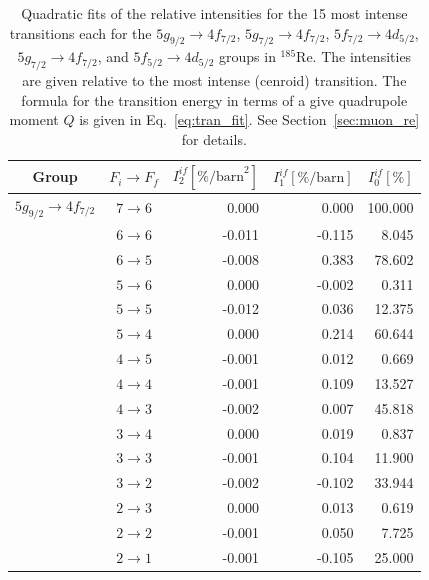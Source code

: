 %
%
%
\begin{table}[b]
\caption{\label{tab:re185intens}%
Quadratic fits of the relative intensities for the 15 most intense transitions each for the $5g_{9/2}\rightarrow4f_{7/2}$, $5g_{7/2}\rightarrow4f_{7/2}$, $5f_{7/2}\rightarrow4d_{5/2}$, $5g_{7/2}\rightarrow4f_{7/2}$, and $5f_{5/2}\rightarrow4d_{5/2}$ groups in $^{185}$Re. The intensities are given relative to the most intense (cenroid) transition. The formula for the transition energy in terms of a give quadrupole moment $Q$ is given in Eq.~\eqref{eq:tran_fit}. See Section~\ref{sec:muon_re} for details.}
\centering
\begin{tiny}
\begin{tabular}{cc|rrr}
Group& $F_i \rightarrow F_f$ & $I_2^{if} [\%\text{/barn}^2]$ & $I_1^{if} [\%\text{/barn}]$ & $I_0^{if} [\%]$\\[1pt]\hline%
$5g_{9/2} \rightarrow 4f_{7/2}$  &  $7 \rightarrow 6$  &  0.000  &  0.000  &  100.000\\
&  $6 \rightarrow 6$  &  -0.011  &  -0.115  &  8.045\\
&  $6 \rightarrow 5$  &  -0.008  &  0.383  &  78.602\\
&  $5 \rightarrow 6$  &  0.000  &  -0.002  &  0.311\\
&  $5 \rightarrow 5$  &  -0.012  &  0.036  &  12.375\\
&  $5 \rightarrow 4$  &  0.000  &  0.214  &  60.644\\
&  $4 \rightarrow 5$  &  -0.001  &  0.012  &  0.669\\
&  $4 \rightarrow 4$  &  -0.001  &  0.109  &  13.527\\
&  $4 \rightarrow 3$  &  -0.002  &  0.007  &  45.818\\
&  $3 \rightarrow 4$  &  0.000  &  0.019  &  0.837\\
&  $3 \rightarrow 3$  &  -0.001  &  0.104  &  11.900\\
&  $3 \rightarrow 2$  &  -0.002  &  -0.102  &  33.944\\
&  $2 \rightarrow 3$  &  0.000  &  0.013  &  0.619\\
&  $2 \rightarrow 2$  &  -0.001  &  0.050  &  7.725\\
&  $2 \rightarrow 1$  &  -0.001  &  -0.105  &  25.000\\[7pt]


\end{tabular}
\end{tiny}
\end{table}
